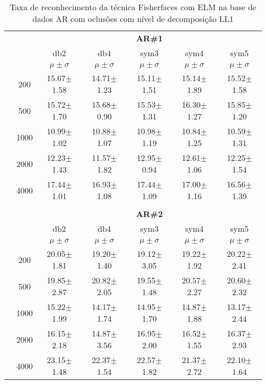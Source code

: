 \begin{table}[H]
	\centering
    \normalsize
	\caption{Taxa de reconhecimento da técnica Fisherfaces  com ELM na base de dados AR com oclusões com nível de decomposição LL1}
	\begin{tabular}{|c|c|c c c c c|}
\cline{3-7}
\multicolumn{2}{c|}{\multirow{3}{*}{}} & \multicolumn{5}{c|}{\textbf{AR\#1}}   \\\cline{3-7} 
\multicolumn{2}{c|}{}  & db2 & db4 & sym3 & sym4 & sym5 \\\cline{3-7}%
\multicolumn{2}{c|}{}& $\mu \pm \sigma$ & $\mu \pm \sigma$ & $\mu \pm \sigma$ & $\mu \pm \sigma$ & $\mu \pm \sigma$ \\\hline


\multicolumn{1}{|c|}{ \multirow{5}{*}{\rotatebox[origin=c]{90}{\textbf{Neurônios}}} }
&200	&15.67$\pm$1.58 &14.71$\pm$1.23	&15.11$\pm$1.51	&15.14$\pm$1.89 &15.52$\pm$1.58\\\cline{2-7}
&500	&15.72$\pm$1.70	&15.68$\pm$0.90	&15.53$\pm$1.31	&16.30$\pm$1.27	&15.85$\pm$1.20\\\cline{2-7}
&1000	&10.99$\pm$1.02	&10.88$\pm$1.07	&10.98$\pm$1.19	&10.84$\pm$1.25	&10.59$\pm$1.31\\\cline{2-7}
&2000	&12.23$\pm$1.43	&11.57$\pm$1.82	&12.95$\pm$0.94	&12.61$\pm$1.06	&12.25$\pm$1.54\\\cline{2-7}
&4000	&17.44$\pm$1.01	&16.93$\pm$1.08 &17.44$\pm$1.09	&17.00$\pm$1.16	&16.56$\pm$1.39





\\\midrule%

\multicolumn{7}{c}{}\\ 

\cline{3-7}
\multicolumn{2}{c|}{\multirow{3}{*}{}} & \multicolumn{5}{c|}{\textbf{AR\#2}}   \\\cline{3-7} 

\multicolumn{2}{c|}{}  & db2 & db4 & sym3 & sym4 & sym5 \\\cline{3-7}
\multicolumn{2}{c|}{}& $\mu \pm \sigma$ & $\mu \pm \sigma$ & $\mu \pm \sigma$ & $\mu \pm \sigma$ & $\mu \pm \sigma$ \\\hline


\multicolumn{1}{|c|}{ \multirow{5}{*}{\rotatebox[origin=c]{90}{\textbf{Neurônios}}} }
&200	&20.05$\pm$1.81	&19.20$\pm$1.40	&19.12$\pm$3.05	&19.22$\pm$1.92	&20.22$\pm$2.41\\\cline{2-7}
&500	&19.85$\pm$2.87	&20.82$\pm$2.05	&19.55$\pm$1.48	&20.57$\pm$2.27 &20.60$\pm$2.32\\\cline{2-7}
&1000	&15.22$\pm$1.99	&14.17$\pm$1.74	&14.95$\pm$1.70	&14.87$\pm$1.88	&13.17$\pm$2.44\\\cline{2-7}
&2000	&16.15$\pm$2.18	&14.87$\pm$3.56	&16.95$\pm$2.00	&16.52$\pm$1.55	&16.37$\pm$2.93\\\cline{2-7}
&4000	&23.15$\pm$1.48	&22.37$\pm$1.54	&22.57$\pm$1.82	&21.37$\pm$2.72	&22.10$\pm$1.64


\end{tabular}
\end{table}
